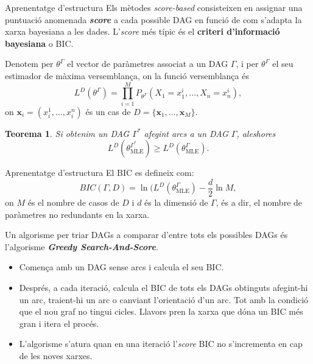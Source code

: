 \documentclass{beamer}
\newtheorem{teorema}{Teorema}
\theoremstyle{definition}
\begin{document}
\begin{frame}{Aprenentatge d'estructura}
Els m\`{e}todes \emph{score-based} consisteixen en assignar una puntuaci\'{o} anomenada \textbf{\emph{score}} a cada possible DAG en funci\'{o} de com s'adapta la xarxa bayesiana a les dades. L'\emph{score} m\'{e}s t\'{i}pic \'{e}s el \textbf{criteri d'informaci\'{o} bayesiana} o BIC.
\pause

Denotem per $\theta^{\Gamma}$ el vector de
par\`{a}metres associat a un DAG $\Gamma$, i per $\theta^{\Gamma}$ el seu estimador de m\`{a}xima versemblan\c{c}a, on la funci\'{o} versemblan\c{c}a \'{e}s
\[L^D(\theta^{\Gamma})=\prod_{i=1}^MP_{\theta^{\Gamma}}(X_1=x_1^i,\ldots,X_n=x_n^i),\]
on $\boldsymbol{x}_i=(x_i^1,\ldots,x_i^n)$ \'{e}s un cas de $D=\{\boldsymbol{x}_1,\ldots,\boldsymbol{x}_M\}$.
\pause
\begin{teorema}
Si obtenim un DAG $\Gamma^*$ afegint arcs a un DAG $\Gamma$, aleshores
\[L^D(\theta^{\Gamma^*}_{\text{MLE}})\geq L^D(\theta^{\Gamma}_{\text{MLE}}).\]
\end{teorema}
\end{frame}

\begin{frame}{Aprenentatge d'estructura}
El BIC es defineix com:
\[BIC(\Gamma,D)=\ln(L^D(\theta^{\Gamma}_{\text{MLE}})-\frac{d}{2}\ln M,\]
on $M$ \'{e}s el nombre de casos de $D$ i $d$ \'{e}s la dimensi\'{o} de $\Gamma$, \'{e}s a dir, el nombre de par\`{a}metres no redundants en la xarxa.
\pause

Un algorisme per triar DAGs a comparar d'entre tots els possibles DAGs \'{e}s l'algorisme \textbf{\emph{Greedy Search-And-Score}}.
\begin{itemize}
\item Comen\c{c}a amb un DAG sense arcs i calcula el seu BIC.
\pause
\item Despr\'{e}s, a cada iteraci\'{o}, calcula el BIC de tots els DAGs obtinguts afegint-hi un arc, traient-hi un arc o canviant l'orientaci\'{o} d'un arc. Tot amb la condici\'{o} que el nou graf no tingui cicles. Llavors pren la xarxa que d\'{o}na un BIC m\'{e}s gran i itera el proc\'{e}s.
\pause
\item L'algorisme s'atura quan en una iteraci\'{o} l'\emph{score} BIC no s'incrementa en cap de les noves xarxes.
\end{itemize}
\end{frame}
\end{document}
